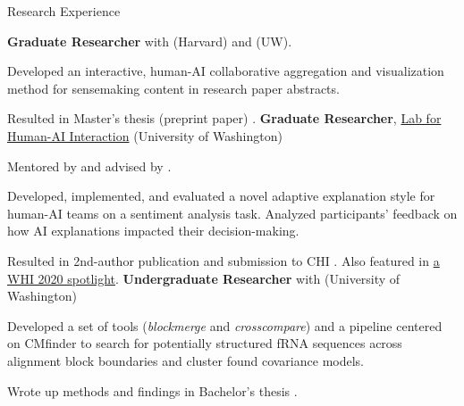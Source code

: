 \begin{rubric}{Research Experience}

\entry*[2020 -- 2021] %
	\textbf{Graduate Researcher} with \pGlassmanE{} (Harvard) and \pWeldD{} (UW).
	\par Developed an interactive, human-AI collaborative aggregation and visualization method for sensemaking content in research paper abstracts.
	\par Resulted in Master's thesis (preprint paper) \cite{zhou2021thesis}.
\entry*[2019 -- 2021] %
	\textbf{Graduate Researcher}, \href{http://hai.cs.washington.edu}{Lab for Human-AI Interaction} (University of Washington)
	\par Mentored by \pBansalG{} and advised by \pWeldD{}.
	\par Developed, implemented, and evaluated a novel adaptive explanation style for human-AI teams on a sentiment analysis task. Analyzed participants' feedback on how AI explanations impacted their decision-making.
	\par Resulted in 2nd-author publication and submission to CHI \cite{bansal2021does}. Also featured in \href{https://sites.google.com/view/whi2020/home}{a WHI 2020 spotlight}.
\entry*[2018 -- 2019] %
    \textbf{Undergraduate Researcher} with \pRuzzoL{} (University of Washington)
    \par Developed a set of tools (\textit{blockmerge} and \textit{crosscompare}) and a pipeline centered on CMfinder to search for potentially structured fRNA sequences across alignment block boundaries and cluster found covariance models.
    \par Wrote up methods and findings in Bachelor's thesis \cite{zhou2019thesis}.
\end{rubric}